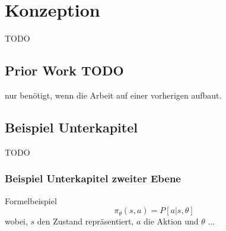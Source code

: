 \chapter{Konzeption}
TODO

\section{Prior Work TODO}
nur benötigt, wenn die Arbeit auf einer vorherigen aufbaut.

\section{Beispiel Unterkapitel}
TODO

\subsection{Beispiel Unterkapitel zweiter Ebene}
Formelbeispiel
\begin{equation}
	\pi_\theta(s, a) = P [a | s, \theta]
\end{equation}
wobei, $s$ den Zustand repräsentiert, $a$ die Aktion und $\theta$ ...